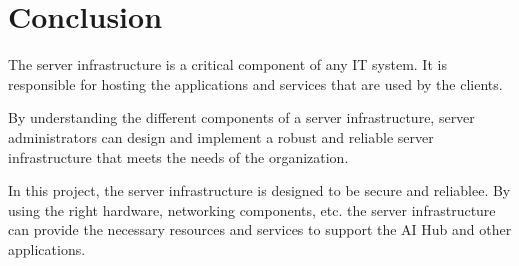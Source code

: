  
\section{Conclusion}

The server infrastructure is a critical component of any IT system. It is responsible for hosting the applications and services that are used by the clients.

By understanding the different components of a server infrastructure, server administrators can design and implement a robust and reliable server infrastructure that meets the needs of the organization.

In this project, the server infrastructure is designed to be secure and reliablee. By using the right hardware, networking components, etc. the server infrastructure can provide the necessary resources and services to support the AI Hub and other applications.

